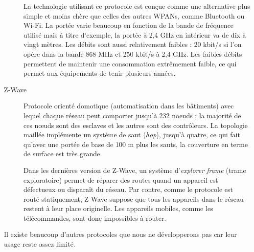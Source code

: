 \begin{description}
	La technologie utilisant ce protocole est conçue comme une alternative plus simple et moins chère que celles des autres WPANs, comme Bluetooth ou Wi-Fi. La portée varie beaucoup en fonction de la bande de fréquence utilisé mais à titre d'exemple, la portée à 2,4 GHz en intérieur va de dix à vingt mètres. Les débits sont aussi relativement faibles : 20 kbit/s si l'on opère dans la bande 868 MHz et 250 kbit/s à 2,4 GHz. Les faibles débits permettent de maintenir une consommation extrêmement faible, ce qui permet aux équipements de tenir plusieurs années.	

	\item[Z-Wave]
	Protocole orienté domotique (automatisation dans les bâtiments) avec lequel chaque réseau peut comporter jusqu'à 232 noeuds ; la majorité de ces nœuds  sont des esclaves et les autres sont des contrôleurs. La topologie maillée implémente un système de saut (\textit{hop}), jusqu'à quatre, ce qui fait qu'avec une portée de base de 100 m plus les sauts, la couverture en terme de surface est très grande.

	Dans les dernières version de Z-Wave, un système d'\textit{explorer frame} (trame exploratoire) permet de réparer des routes quand un appareil est défectueux ou disparaît du réseau. Par contre, comme le protocole est routé statiquement, Z-Wave suppose que tous les appareils dans le réseau restent à leur place originelle. Les appareils mobiles, comme les télécommandes, sont donc impossibles à router.
\end{description}

Il existe beaucoup d'autres protocoles que nous ne développerons pas car leur usage reste assez limité.
